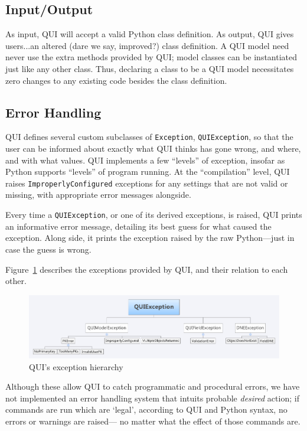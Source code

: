 \documentclass{article} %
\newcommand{\il}[1]{\mbox{\lstinline{#1}}}
\begin{document}
\subsection{Input/Output}
As input, QUI will accept a valid Python class definition. As output, QUI gives users...an altered (dare we say, improved?) class definition.
A QUI model need never use the extra methods provided by QUI; model classes can be instantiated just like any other class. Thus, declaring
a class to be a QUI model necessitates zero changes to any existing code besides the class definition.

\subsection{Error Handling}
QUI defines several custom subclasses of \il{Exception}, \il{QUIException}, so that the
user can be informed about exactly what QUI thinks has gone wrong, and where, and with what values.
QUI implements a few ``levels'' of exception, insofar as Python supports ``levels'' of program running. At the ``compilation'' level, QUI
raises \il{ImproperlyConfigured} exceptions for any settings that are not valid or missing, with appropriate error messages alongside.

Every time a \il{QUIException}, or one of its derived exceptions, is raised, QUI prints an informative error message, detailing its best
guess for what caused the exception. Along side, it prints the exception raised by the raw Python---just in case the guess is wrong.

Figure~\ref{fig:exceptionhier} describes the exceptions provided by QUI, and their relation to each other.
\begin{figure}[htb]
\centering
\includegraphics[width=450px]{ExceptionHierarchy}
\caption{QUI's exception hierarchy}
\label{fig:exceptionhier}
\end{figure}

Although these allow QUI to catch programmatic and procedural errors, we have not implemented an error handling system that intuits
probable \emph{desired} action; if commands are run which are `legal', according to QUI and Python syntax, no errors or warnings are raised---
no matter what the effect of those commands are.
\end{document}
